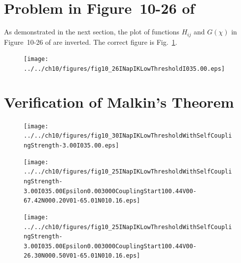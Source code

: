 \documentclass{article}
\begin{document}
\section{Problem in Figure~10-26 of \citet{izhikevich07}}
\label{sec:problemInIzhikevich}

As demonstrated in the next section, the plot of functions $H_{ij}$ and
$G(\chi)$ in Figure~10-26 of \citet{izhikevich07} are inverted. The correct
figure is Fig.~\ref{fig:correctFig10-26INapIKLowThresholdI035.esp}.

\begin{figure}
\begin{center}
\texttt{[image: ../../ch10/figures/fig10\_26INapIKLowThresholdI035.00.eps]}

\caption{}

\label{fig:correctFig10-26INapIKLowThresholdI035.esp}
\end{center}
\end{figure} 

\section{Verification of Malkin's Theorem}
\label{sec:verificationMalkinsTheorem}

\begin{figure}
\begin{center}
\texttt{[image: ../../ch10/figures/fig10\_30INapIKLowThresholdWithSelfCouplingStrength-3.00I035.00.eps]}

\caption{}

\label{fig:gSelfCoupling-3.0} 
\end{center}
\end{figure} 

\begin{figure}
\begin{center}
\texttt{[image: ../../ch10/figures/fig10\_25INapIKLowThresholdWithSelfCouplingStrength-3.00I035.00Epsilon0.003000CouplingStart100.44V00-67.42N000.20V01-65.01N010.16.eps]}

\caption{}

\label{fig:selfCoupling-3.0_lowerConvergence}
\end{center}
\end{figure} 

\begin{figure}
\begin{center}
\texttt{[image: ../../ch10/figures/fig10\_25INapIKLowThresholdWithSelfCouplingStrength-3.00I035.00Epsilon0.003000CouplingStart100.44V00-26.30N000.50V01-65.01N010.16.eps]}

\caption{}

\label{fig:selfCoupling-3.0_upperConvergence}
\end{center}
\end{figure} 
\end{document}
